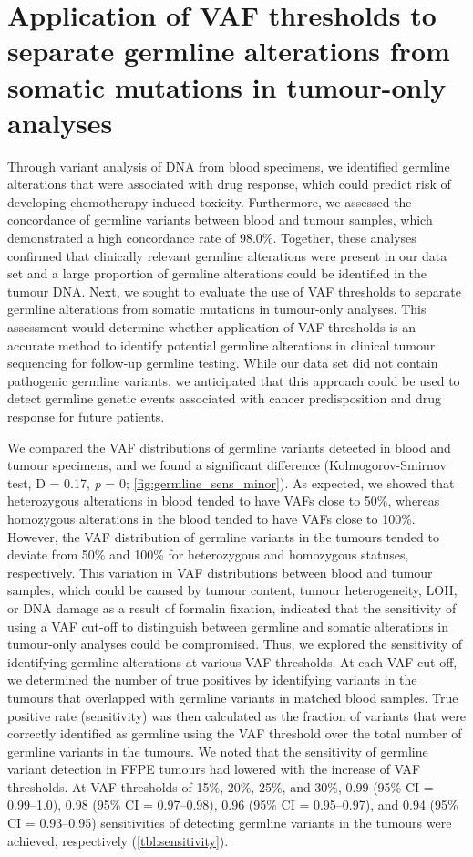 \section{Application of VAF thresholds to separate germline alterations from somatic mutations in tumour-only analyses}
\label{sec:ApplicationofVAFthresholdstoseparategermlinealterationsfromsomaticmutationsintumour-onlyanalyses}

Through variant analysis of DNA from blood specimens, we identified germline alterations that were associated with drug response, which could predict risk of developing chemotherapy-induced toxicity. Furthermore, we assessed the concordance of germline variants between blood and tumour samples, which demonstrated a high concordance rate of 98.0\%. Together, these analyses confirmed that clinically relevant germline alterations were present in our data set and a large proportion of germline alterations could be identified in the tumour DNA. Next, we sought to evaluate the use of VAF thresholds to separate germline alterations from somatic mutations in tumour-only analyses. This assessment would determine whether application of VAF thresholds is an accurate method to identify potential germline alterations in clinical tumour sequencing for follow-up germline testing. While our data set did not contain pathogenic germline variants, we anticipated that this approach could be used to detect germline genetic events associated with cancer predisposition and drug response for future patients.

We compared the VAF distributions of germline variants detected in blood and tumour specimens, and we found a significant difference (Kolmogorov-Smirnov test, D = 0.17, \textit{p} = 0; \autoref{fig:germline_sens_minor}). As expected, we showed that heterozygous alterations in blood tended to have VAFs close to 50\%, whereas homozygous alterations in the blood tended to have VAFs close to 100\%. However, the VAF distribution of germline variants in the tumours tended to deviate from 50\% and 100\% for heterozygous and homozygous statuses, respectively. This variation in VAF distributions between blood and tumour samples, which could be caused by tumour content, tumour heterogeneity, LOH, or DNA damage as a result of formalin fixation, indicated that the sensitivity of using a VAF cut-off to distinguish between germline and somatic alterations in tumour-only analyses could be compromised. Thus, we explored the sensitivity of identifying germline alterations at various VAF thresholds. At each VAF cut-off, we determined the number of true positives by identifying variants in the tumours that overlapped with germline variants in matched blood samples. True positive rate (sensitivity) was then calculated as the fraction of variants that were correctly identified as germline using the VAF threshold over the total number of germline variants in the tumours. We noted that the sensitivity of germline variant detection in FFPE tumours had lowered with the increase of VAF thresholds. At VAF thresholds of 15\%, 20\%, 25\%, and 30\%, 0.99 (95\% CI = 0.99--1.0), 0.98 (95\% CI = 0.97--0.98), 0.96 (95\% CI = 0.95--0.97), and 0.94 (95\% CI = 0.93--0.95) sensitivities of detecting germline variants in the tumours were achieved, respectively (\autoref{tbl:sensitivity}).

